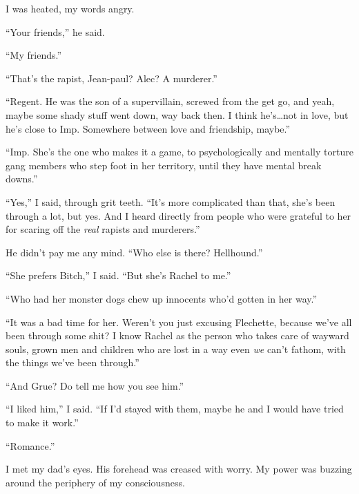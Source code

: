I was heated, my words angry.



``Your friends,'' he said.



``My friends.''



``That's the rapist, Jean-paul?  Alec?  A murderer.''



``Regent.  He was the son of a supervillain, screwed from the get go, and yeah, maybe some shady stuff went down, way back then.  I think he's\ldots not in love, but he's close to Imp.  Somewhere between love and friendship, maybe.''



``Imp.  She's the one who makes it a game, to psychologically and mentally torture gang members who step foot in her territory, until they have mental break downs.''



``Yes,'' I said, through grit teeth.  ``It's more complicated than that, she's been through a lot, but yes.  And I heard directly from people who were grateful to her for scaring off the \emph{real} rapists and murderers.''



He didn't pay me any mind.  ``Who else is there?  Hellhound.''



``She prefers Bitch,'' I said.  ``But she's Rachel to me.''



``Who had her monster dogs chew up innocents who'd gotten in her way.''



``It was a bad time for her.  Weren't you just excusing Flechette, because we've all been through some shit?  I know Rachel as the person who takes care of wayward souls, grown men and children who are lost in a way even \emph{we} can't fathom, with the things we've been through.''



``And Grue?  Do tell me how you see him.''



``I liked him,'' I said.  ``If I'd stayed with them, maybe he and I would have tried to make it work.''



``Romance.''



I met my dad's eyes.  His forehead was creased with worry.  My power was buzzing around the periphery of my consciousness.



